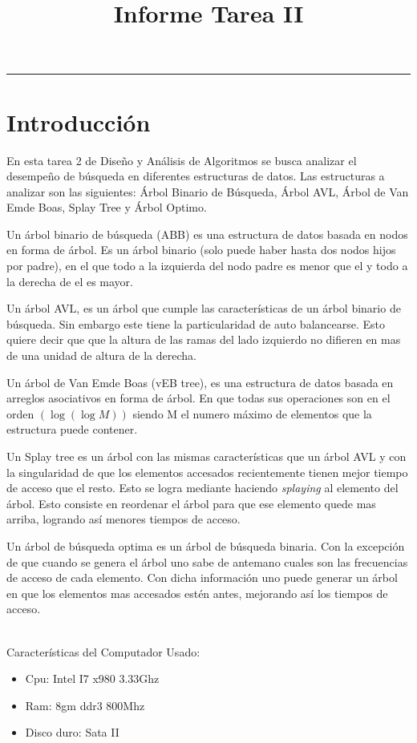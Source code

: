\documentclass[letterpaper,12pt]{article}
\title{Informe Tarea II}
\makeatletter
\renewcommand{\maketitle}{\begin{titlepage}%
    \let\footnotesize\small
    \let\footnoterule\relax
    \parindent \z@
    \reset@font
    \null\vfil
    \begin{flushleft}    
      \small \@curso \par
      \huge{\textbf{\@title}} \par
    \end{flushleft}
    \par
    \hrule height 4pt
    \par
    \begin{flushright}
      \Huge{\textbf{\@author}} \par
      \bigskip
      \normalsize{\@primerautor} \par
      \normalsize{\@segundoautor} \par
      \bigskip
      \bigskip
      \normalsize \@date \par
    \end{flushright}
    \vskip 60\p@
    \vfil\null
  \end{titlepage}%
  \setcounter{footnote}{0}%
}
\makeatother
\begin{document}
 
\maketitle
 
 
\newpage
\thispagestyle{empty}
\tableofcontents
\setcounter{page}{0}
\newpage
 
\section{Introducción}
En esta tarea 2 de Diseño y Análisis de Algoritmos se busca analizar el desempeño de búsqueda en diferentes estructuras de datos. Las estructuras a analizar son las siguientes: Árbol Binario de Búsqueda, Árbol AVL, Árbol de Van Emde Boas, Splay Tree y Árbol Optimo.
 
Un árbol binario de búsqueda (ABB) es una estructura de datos basada en nodos en forma de árbol. Es un árbol binario (solo puede haber hasta dos nodos hijos por padre), en el que todo a la izquierda del nodo padre es menor que el y todo a la derecha de el es mayor.

Un árbol AVL, es un árbol que cumple las características de un árbol binario de búsqueda. Sin embargo este tiene la particularidad de auto balancearse. Esto quiere decir que que la altura de las ramas del lado izquierdo no difieren en mas de una unidad de altura de la derecha.

Un árbol de Van Emde Boas (vEB tree), es una estructura de datos basada en arreglos asociativos en forma de árbol. En que todas sus operaciones son en el orden $(\log \left(\log M \right))$ siendo M el numero máximo de elementos que la estructura puede contener.

Un Splay tree es un árbol con las mismas características que un árbol AVL y con la singularidad de que los elementos accesados recientemente tienen mejor tiempo de acceso que el resto. Esto se logra mediante haciendo \textit{splaying} al elemento del árbol. Esto consiste en reordenar el árbol para que ese elemento quede mas arriba, logrando así menores tiempos de acceso. 

Un árbol de búsqueda optima es un árbol de búsqueda binaria. Con la excepción de que cuando se genera el árbol uno sabe de antemano cuales son las frecuencias de acceso de cada elemento. Con dicha información uno puede generar un árbol en que los elementos mas accesados estén antes, mejorando así los tiempos de acceso.

~\\
Características del Computador Usado:
\begin{itemize}
\item Cpu: Intel I7 x980 3.33Ghz
\item Ram: 8gm ddr3 800Mhz
\item Disco duro: Sata II
\end{itemize}
\newpage 
\end{document}
